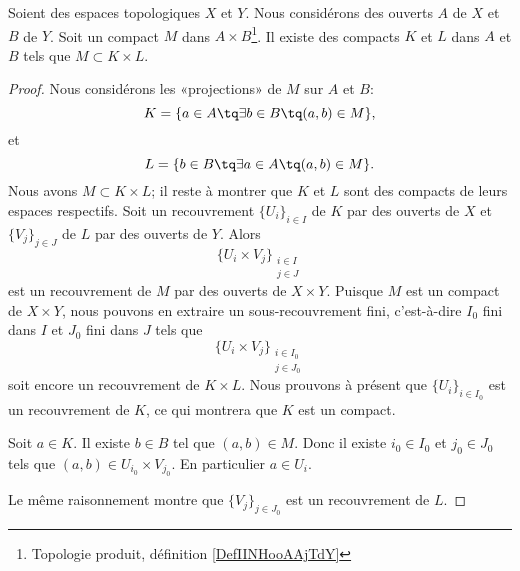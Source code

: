 \begin{proposition}
	Soient des espaces topologiques \( X\) et \( Y\). Nous considérons des ouverts \( A\) de \( X\) et \( B\) de \( Y\). Soit un compact \( M\) dans \( A\times B\)\footnote{Topologie produit, définition \ref{DefIINHooAAjTdY}}. Il existe des compacts \( K\) et \( L\) dans \( A\) et \( B\) tels que \( M\subset K\times L\).
\end{proposition}

\begin{proof}
	Nous considérons les «projections» de \( M\) sur \( A\) et \( B\):
	\begin{equation}
		K=\{ a\in A\tq \exists b\in B\tq (a,b)\in M \},
	\end{equation}
	et
	\begin{equation}
		L=\{ b\in B\tq \exists a\in A\tq (a,b)\in M \}.
	\end{equation}
	Nous avons \( M\subset K\times L\); il reste à montrer que \( K\) et \( L\) sont des compacts de leurs espaces respectifs. Soit un recouvrement \( \{ U_i \}_{i\in I} \) de \( K\) par des ouverts de \( X\) et \( \{ V_j \}_{j\in J}\) de \( L\) par des ouverts de \( Y\). Alors
	\begin{equation}
		\{ U_i\times  V_j \}_{\substack{i\in I\\j\in J}}
	\end{equation}
	est un recouvrement de \( M\) par des ouverts de \( X\times Y\). Puisque \( M\) est un compact de \( X\times Y\), nous pouvons en extraire un sous-recouvrement fini, c'est-à-dire \( I_0\) fini dans \( I\) et \( J_0\) fini dans \( J\) tels que
	\begin{equation}
		\{ U_i\times  V_j \}_{\substack{i\in I_0\\j\in J_0}}
	\end{equation}
	soit encore un recouvrement de \( K\times L\). Nous prouvons à présent que \( \{ U_i \}_{i\in I_0}\) est un recouvrement de \( K\), ce qui montrera que \( K\) est un compact.

	Soit \( a\in K\). Il existe \( b\in B\) tel que \( (a,b)\in M\). Donc il existe \( i_0\in I_0\) et \( j_0\in J_0\) tels que \( (a,b)\in U_{i_0}\times V_{j_0}\). En particulier \( a\in U_i\).

	Le même raisonnement montre que \( \{ V_j \}_{j\in J_0}\) est un recouvrement de \( L\).
\end{proof}


